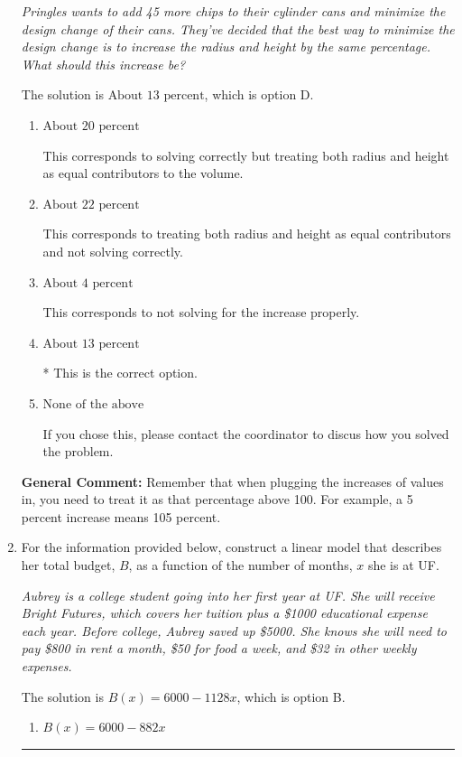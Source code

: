 \documentclass{extbook}[14pt]
\newcommand{\litem}[1]{\item #1

\rule{\textwidth}{0.4pt}}
\begin{document}
\begin{enumerate}
{\begin{center}
    \textit{ Pringles wants to add 45  more chips to their cylinder cans and minimize the design change of their cans. They've decided that the best way to minimize the design change is to increase the radius and height by the same percentage. What should this increase be? }
\end{center}


The solution is \( \text{About } 13 \text{ percent} \), which is option D.\begin{enumerate}[label=\Alph*.]
\item \( \text{About } 20 \text{ percent} \)

This corresponds to solving correctly but treating both radius and height as equal contributors to the volume.
\item \( \text{About } 22 \text{ percent} \)

This corresponds to treating both radius and height as equal contributors and not solving correctly.
\item \( \text{About } 4 \text{ percent} \)

This corresponds to not solving for the increase properly.
\item \( \text{About } 13 \text{ percent} \)

* This is the correct option.
\item \( \text{None of the above} \)

If you chose this, please contact the coordinator to discus how you solved the problem.
\end{enumerate}

\textbf{General Comment:} Remember that when plugging the increases of values in, you need to treat it as that percentage above 100. For example, a 5 percent increase means 105 percent.
}
\litem{
For the information provided below, construct a linear model that describes her total budget, $B$, as a function of the number of months, $x$ she is at UF.

\begin{center}
    \textit{ Aubrey is a college student going into her first year at UF. She will receive Bright Futures, which covers her tuition plus a \$1000 educational expense each year. Before college, Aubrey saved up \$5000. She knows she will need to pay \$800 in rent a month, \$50 for food a week, and \$32 in other weekly expenses. }
\end{center}


The solution is \( B(x) = 6000 - 1128 x \), which is option B.\begin{enumerate}[label=\Alph*.]
\item \( B(x) = 6000 - 882 x \)


\end{enumerate}}
\end{enumerate}
\end{document}
